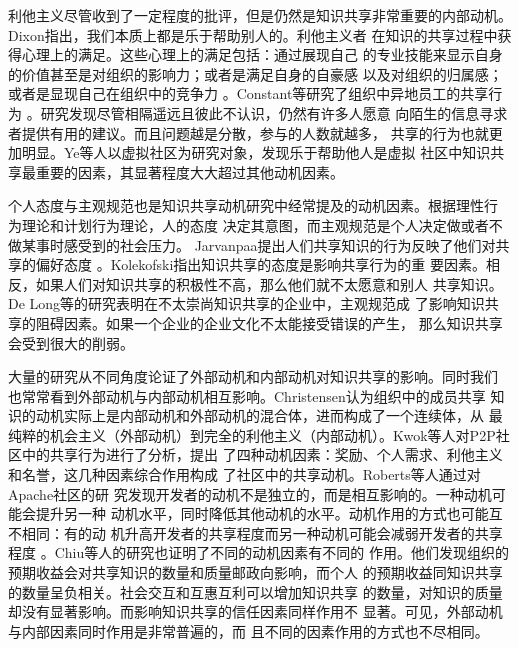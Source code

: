 \documentclass[12pt,a4paper]{ctexart}
\begin{document}
利他主义尽管收到了一定程度的批评，但是仍然是知识共享非常重要的内部动机。
Dixon指出，我们本质上都是乐于帮助别人的\cite{dixon2000ckc}。利他主义者
在知识的共享过程中获得心理上的满足。这些心理上的满足包括：通过展现自己
的专业技能来显示自身的价值甚至是对组织的影响力；或者是满足自身的自豪感
以及对组织的归属感；或者是显现自己在组织中的竞争力
\cite{443078119941201}。Constant等研究了组织中异地员工的共享行为
\cite{44348771996}。研究发现尽管相隔遥远且彼此不认识，仍然有许多人愿意
向陌生的信息寻求者提供有用的建议。而且问题越是分散，参与的人数就越多，
共享的行为也就更加明显。Ye等人以虚拟社区为研究对象，发现乐于帮助他人是虚拟
社区中知识共享最重要的因素，其显著程度大大超过其他动机因素\cite{Ye2006}。

个人态度与主观规范也是知识共享动机研究中经常提及的动机因素。根据理性行
为理论\cite{fishbein1975bai}和计划行为理论\cite{Ajzenbw2002}，人的态度
决定其意图，而主观规范是个人决定做或者不做某事时感受到的社会压力。
Jarvanpaa提出人们共享知识的行为反映了他们对共享的偏好态度
\cite{Jarvenpaaee2000}。Kolekofski指出知识共享的态度是影响共享行为的重
要因素。相反，如果人们对知识共享的积极性不高，那么他们就不太愿意和别人
共享知识\cite{cabrera2002ksd}。De Long等的研究表明在不太崇尚知识共享的企业中，主观规范成
了影响知识共享的阻碍因素\cite{DeLong2000}。如果一个企业的企业文化不太能接受错误的产生，
那么知识共享会受到很大的削弱。

大量的研究从不同角度论证了外部动机和内部动机对知识共享的影响。同时我们
也常常看到外部动机与内部动机相互影响。Christensen认为组织中的成员共享
知识的动机实际上是内部动机和外部动机的混合体，进而构成了一个连续体，从
最纯粹的机会主义（外部动机）到完全的利他主义（内部动机）\cite{Christensen2005}。Kwok等人对P2P社区中的共享行为进行了分析，提出
了四种动机因素：奖励、个人需求、利他主义和名誉，这几种因素综合作用构成
了社区中的共享动机\cite{kwok2004ksc}。Roberts等人通过对Apache社区的研
究发现开发者的动机不是独立的，而是相互影响的。一种动机可能会提升另一种
动机水平，同时降低其他动机的水平。动机作用的方式也可能互不相同：有的动
机升高开发者的共享程度而另一种动机可能会减弱开发者的共享程度
\cite{2151758320060701}。Chiu等人的研究也证明了不同的动机因素有不同的
作用。他们发现组织的预期收益会对共享知识的数量和质量邮政向影响，而个人
的预期收益同知识共享的数量呈负相关。社会交互和互惠互利可以增加知识共享
的数量，对知识的质量却没有显著影响。而影响知识共享的信任因素同样作用不
显著\cite{Chiu2006}。可见，外部动机与内部因素同时作用是非常普遍的，而
且不同的因素作用的方式也不尽相同。
\end{document}
